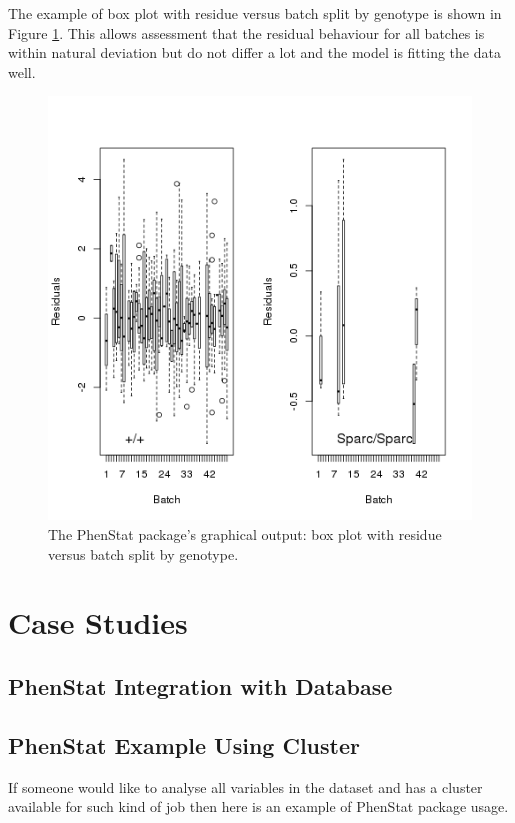 \documentclass[12pt,a4paper]{article}
\begin{document}
The example of box plot with residue versus batch split by genotype is shown in Figure \ref{fig:13}. This allows assessment that the residual behaviour for all batches is within natural deviation but do not differ a lot and the model is fitting the data well.
\begin{figure}[!htpb]%
\centerline{\includegraphics[scale=0.5]{boxplotResidualBatch.png}}
\caption{The PhenStat package's graphical output: box plot with residue versus batch split by genotype.}\label{fig:13}
\end{figure}
   
\section{Case Studies}
\subsection{PhenStat Integration with Database}
\subsection{PhenStat Example Using Cluster}
If someone would like to analyse all variables in the dataset and has a cluster available for such kind of job then here is an example of PhenStat package usage.
\end{document}
